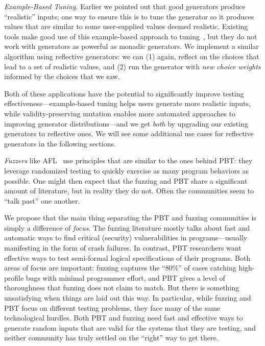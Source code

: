 {\em Example-Based Tuning.} Earlier we pointed out that good generators
produce ``realistic'' inputs; one way to ensure this is to tune the generator so
it produces values that are similar to some user-supplied values deemed
realistic. Existing tools make good use of this example-based approach to
tuning~\cite{soremekun2020inputs}, but they do not work with generators as
powerful as monadic generators. We implement a similar algorithm using
reflective generators: we can (1) again, reflect on the choices that lead to a
set of realistic values, and (2) run the generator with {\em new choice weights}
informed by the choices that we saw.

Both of these applications have the potential to significantly improve
testing effectiveness---example-based tuning helps users generate more
realistic inputs, while validity-preserving mutation enables more
automated approaches to improving generator distributions---and we get
{\em both} by upgrading our existing generators to reflective ones. We
will see some additional use cases for reflective generators in the
following sections.

{\em Fuzzers} like AFL~\cite{afl-readme} use principles that are similar to the
ones behind PBT: they leverage randomized testing to quickly exercise as
many program behaviors as possible.  One might then expect that the fuzzing and
PBT share a significant amount of literature, but in reality they do not. Often
the communities seem to ``talk past'' one another.

We propose that the main thing separating the PBT and fuzzing communities is
simply a difference of {\em focus}. The fuzzing literature mostly talks about
fast and automatic ways to find critical (security) vulnerabilities in
programs---usually manifesting in the form of crash failures.  In contrast, PBT
researchers want effective ways to test semi-formal logical specifications of
their programs. Both areas of focus are important: fuzzing captures the ``80\%''
of cases catching high-profile bugs with minimal programmer effort, and PBT
gives a level of thoroughness that fuzzing does not claim to match. But there is
something unsatisfying when things are laid out this way. In particular, while
fuzzing and PBT focus on different testing problems, they face many of the same
technological hurdles. Both PBT and fuzzing need fast and effective ways to
generate random inputs that are valid for the systems that they are testing, and
neither community has truly settled on the ``right'' way to get there.

